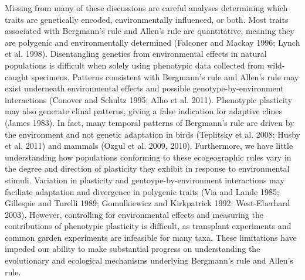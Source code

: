 \documentclass[]{article}
\begin{document}
Missing from many of these discussions are careful analyses determining
which traits are genetically encoded, environmentally influenced, or
both. Most traits associated with Bergmann's rule and Allen's rule are
quantitative, meaning they are polygenic and environmentally determined
(Falconer and Mackay 1996; Lynch et al. 1998). Disentangling genetics
from environmental effects in natural populations is difficult when
solely using phenotypic data collected from wild-caught specimens.
Patterns consistent with Bergmann's rule and Allen's rule may exist
underneath environmental effects and possible genotype-by-environment
interactions (Conover and Schultz 1995; Alho et al. 2011). Phenotypic
plasticity may also generate clinal patterns, giving a false indication
for adaptive clines (James 1983). In fact, many temporal patterns of
Bergmann's rule are driven by the environment and not genetic adaptation
in birds (Teplitsky et al. 2008; Husby et al. 2011) and mammals (Ozgul
et al. 2009, 2010). Furthermore, we have little understanding how
populations conforming to these ecogeographic rules vary in the degree
and direction of plasticity they exhibit in response to environmental
stimuli. Variation in plasticity and gentoype-by-environment
interactions may faciliate adaptation and divergence in polygenic traits
(Via and Lande 1985; Gillespie and Turelli 1989; Gomulkiewicz and
Kirkpatrick 1992; West-Eberhard 2003). However, controlling for
environmental effects and measuring the contributions of phenotypic
plasticity is difficult, as transplant experiments and common garden
experiments are infeasible for many taxa. These limitations have impeded
our ability to make substantial progress on understanding the
evolutionary and ecological mechanisms underlying Bergmann's rule and
Allen's rule.
\end{document}

